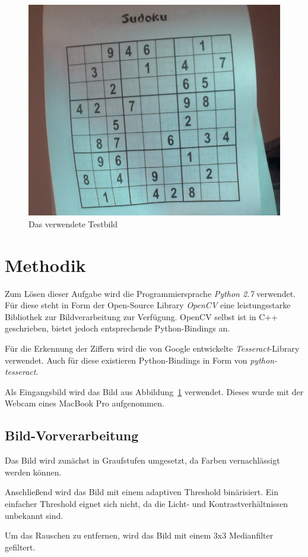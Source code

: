 
\begin{figure}[t]
    \begin{center}
        \includegraphics[width=.5\textwidth]{Abbildungen/Input}
    \end{center}
    \caption{Das verwendete Testbild}
    \label{fig:Input}
\end{figure}

\section{Methodik}
Zum Lösen dieser Aufgabe wird die Programmiersprache \emph{Python 2.7} verwendet.
Für diese steht in Form der Open-Source Library \emph{OpenCV} eine leistungsstarke Bibliothek zur Bildverarbeitung zur Verfügung.
OpenCV selbst ist in C++ geschrieben, bietet jedoch entsprechende Python-Bindings an.

Für die Erkennung der Ziffern wird die von Google entwickelte \emph{Tesseract}-Library verwendet. Auch für diese existieren Python-Bindings in Form von \emph{python-tesseract}.

Als Eingangsbild wird das Bild aus Abbildung~\ref{fig:Input} verwendet. Dieses wurde mit der Webcam eines MacBook Pro aufgenommen.

\subsection{Bild-Vorverarbeitung}
Das Bild wird zunächst in Graufstufen umgesetzt, da Farben vernachlässigt werden können.

Anschließend wird das Bild mit einem adaptiven Threshold binärisiert. Ein einfacher Threshold eignet sich nicht, da die Licht- und Kontrastverhältnissen unbekannt sind.

Um das Rauschen zu entfernen, wird das Bild mit einem 3x3 Medianfilter gefiltert.


